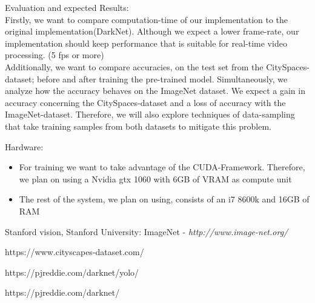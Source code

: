 \documentclass[paper=a4, fontsize=13pt]{scrartcl} %
\numberwithin{equation}{section} %
\numberwithin{figure}{section} %
\numberwithin{table}{section} %
\begin{document}
\begin{description}
\item{Evaluation and expected Results:} \\
Firstly, we want to compare computation-time of our implementation to the original implementation(DarkNet). Although we expect a lower frame-rate, our implementation should keep performance that is suitable for real-time video processing. (5 fps or more) \\
Additionally, we want to compare accuracies, on the test set from the CitySpaces-dataset; before and after training the pre-trained model. Simultaneously, we analyze how the accuracy behaves on the ImageNet dataset. We expect a gain in accuracy concerning the CitySpaces-dataset and a loss of accuracy with the ImageNet-dataset. Therefore, we will also explore techniques of data-sampling that take training samples from both datasets to mitigate this problem.
\newpage
\item{Hardware:}
\begin{itemize}
\item For training we want to take advantage of the CUDA-Framework. Therefore, we plan on using a Nvidia gtx 1060 with 6GB of VRAM as compute unit
\item The rest of the system, we plan on using, consists of an i7 8600k and 16GB of RAM
\end{itemize}
\end{description} 

\begin{thebibliography}{9}

  Stanford vision, Stanford University: ImageNet - \textit{http://www.image-net.org/}

https://www.cityscapes-dataset.com/

https://pjreddie.com/darknet/yolo/


https://pjreddie.com/darknet/
\end{thebibliography}
\end{document}
